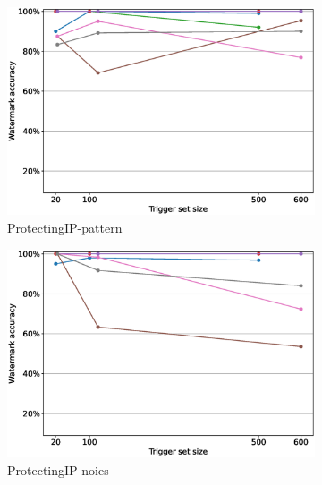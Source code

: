 \begin{figure}
\begin{subfigure}{0.4\linewidth}
        \includegraphics[width=\linewidth]{images/pruning/per_method/ProtectingIP-pattern_pruning_per_method_maximal_pr_rate.eps}
        \caption{ProtectingIP-pattern}
        \label{fig:pruning-max-pr-rate-pattern}
    \end{subfigure}
    \quad
    \begin{subfigure}{0.4\linewidth}
        \includegraphics[width=\linewidth]{images/pruning/per_method/ProtectingIP-noise_pruning_per_method_maximal_pr_rate.eps}
        \caption{ProtectingIP-noies}
        \label{fig:pruning-max-pr-rate-noise}
    \end{subfigure}
    \quad
    \begin{subfigure}{0.4\linewidth}

\end{subfigure}
\end{figure}
